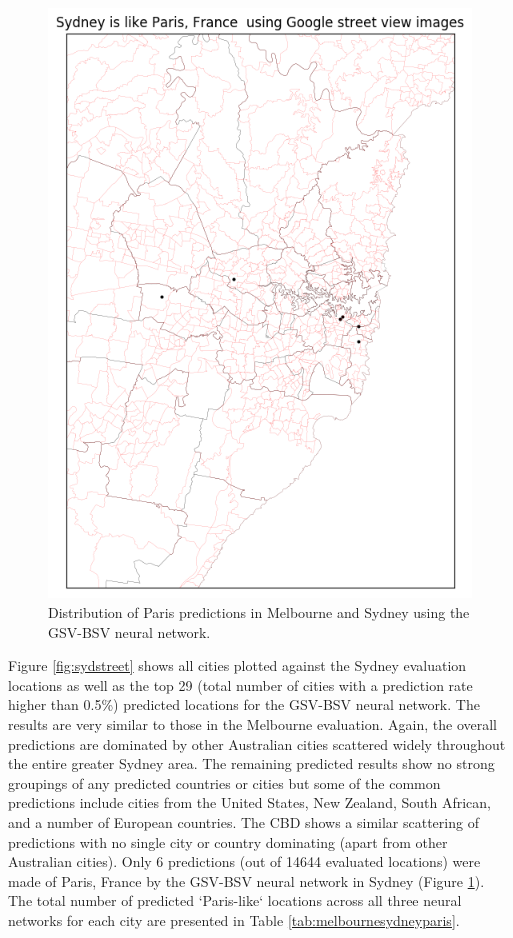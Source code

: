 \documentclass[sageh,times]{sagej}
\begin{document}
\begin{figure}[!htbp]
\includegraphics[scale=0.40]{Images/Sydney_Paris,France-GSV.png} 
\caption{Distribution of Paris predictions in Melbourne and Sydney using the GSV-BSV neural network.}    
 \label{fig:gsv_melsyd_paris}  
\end{figure}


Figure \ref{fig:sydstreet} shows all cities plotted against the Sydney evaluation locations as well as the top 29 (total number of cities with a prediction rate higher than 0.5\%) predicted locations for the GSV-BSV neural network. The results are very similar to those in the Melbourne evaluation. Again, the overall predictions are dominated by other Australian cities scattered widely throughout the entire greater Sydney area. The remaining predicted results show no strong groupings of any predicted countries or cities but some of the common predictions include cities from the United States, New Zealand, South African, and a number of European countries. The CBD shows a similar scattering of predictions with no single city or country dominating (apart from other Australian cities). Only 6 predictions (out of 14644 evaluated locations) were made of Paris, France by the GSV-BSV neural network in Sydney (Figure \ref{fig:gsv_melsyd_paris}). The total number of predicted `Paris-like` locations across all three neural networks for each city are presented in Table \ref{tab:melbournesydneyparis}.
\end{document}
